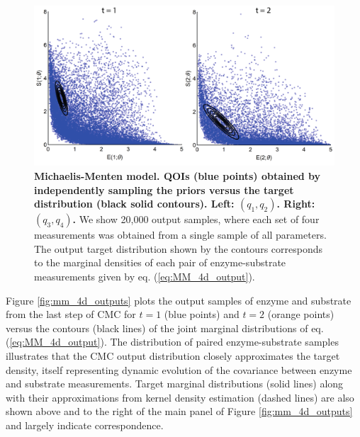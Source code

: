 \begin{figure}[H]
  \centerline{\includegraphics[width=\textwidth]{../figures/mm_4d_main.pdf}}
  \caption{\textbf{Michaelis-Menten model. QOIs (blue points) obtained by independently sampling the priors versus the target distribution (black solid contours). Left: $(q_1,q_2)$. Right: $(q_3,q_4)$.} We show 20,000 output samples, where each set of four measurements was obtained from a single sample of all parameters. The output target distribution shown by the contours corresponds to the marginal densities of each pair of enzyme-substrate measurements given by eq. (\ref{eq:MM_4d_output}).}
  \label{fig:mm_4d_main}
\end{figure}

Figure \ref{fig:mm_4d_outputs} plots the output samples of enzyme and substrate from the last step of CMC for $t=1$ (blue points) and $t=2$ (orange points) versus the contours (black lines) of the joint marginal distributions of eq. (\ref{eq:MM_4d_output}). The distribution of paired enzyme-substrate samples illustrates that the CMC output distribution closely approximates the target density, itself representing dynamic evolution of the covariance between enzyme and substrate measurements. Target marginal distributions (solid lines) along with their approximations from kernel density estimation (dashed lines) are also shown above and to the right of the main panel of Figure \ref{fig:mm_4d_outputs} and largely indicate correspondence.

